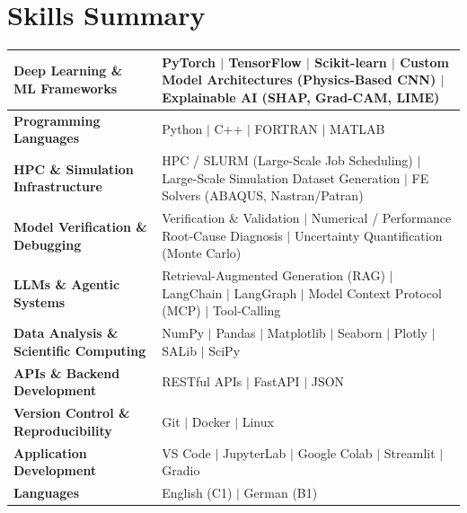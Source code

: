 \documentclass[a4paper,20pt]{article}
\begin{document}
\section{\color{blue}Skills Summary}
\begin{tabular}{|p{8cm}p{10.5cm}|}

\hline
\textbf{Deep Learning \& ML Frameworks} &
PyTorch \(\vert\) TensorFlow \(\vert\) Scikit-learn \(\vert\) Custom Model Architectures (Physics-Based CNN) \(\vert\) Explainable AI (SHAP, Grad-CAM, LIME) \\
\hline

\textbf{Programming Languages} &
Python \(\vert\) C++ \(\vert\) FORTRAN \(\vert\) MATLAB \\
\hline

\textbf{HPC \& Simulation Infrastructure} &
HPC / SLURM (Large-Scale Job Scheduling) \(\vert\) Large-Scale Simulation Dataset Generation \(\vert\) FE Solvers (ABAQUS, Nastran/Patran) \\
\hline

\textbf{Model Verification \& Debugging} &
Verification \& Validation \(\vert\) Numerical / Performance Root-Cause Diagnosis \(\vert\) Uncertainty Quantification (Monte Carlo) \\
\hline

\textbf{LLMs \& Agentic Systems} &
Retrieval-Augmented Generation (RAG) \(\vert\) LangChain \(\vert\) LangGraph \(\vert\) Model Context Protocol (MCP) \(\vert\) Tool-Calling \\
\hline

\textbf{Data Analysis \& Scientific Computing} &
NumPy \(\vert\) Pandas \(\vert\) Matplotlib \(\vert\) Seaborn \(\vert\) Plotly \(\vert\) SALib \(\vert\) SciPy \\
\hline

\textbf{APIs \& Backend Development} &
RESTful APIs \(\vert\) FastAPI \(\vert\) JSON \\
\hline

\textbf{Version Control \& Reproducibility} &
Git \(\vert\) Docker \(\vert\) Linux \\
\hline

\textbf{Application Development} &
VS Code \(\vert\) JupyterLab \(\vert\) Google Colab \(\vert\) Streamlit \(\vert\) Gradio \\
\hline

\textbf{Languages} &
English (C1) \(\vert\) German (B1) \\
\hline
\end{tabular}
\end{document}
